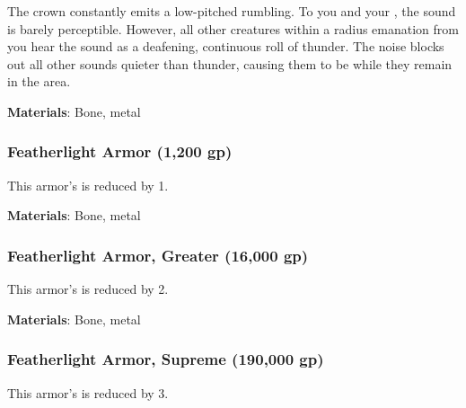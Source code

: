 The crown constantly emits a low-pitched rumbling.
To you and your , the sound is barely perceptible.
However, all other creatures within a \arealarge radius emanation from you hear the sound as a deafening, continuous roll of thunder.
The noise blocks out all other sounds quieter than thunder, causing them to be \deafened while they remain in the area.



\vspace{0.25em}
\textbf{Materials}: Bone, metal


\lowercase{\hypertarget{item:Featherlight Armor}{}}\label{item:Featherlight Armor}
\hypertarget{item:Featherlight Armor}{\subsubsection{Featherlight Armor\hfill{} (1,200 gp)}}

This armor's  is reduced by 1.



\vspace{0.25em}
\textbf{Materials}: Bone, metal


\lowercase{\hypertarget{item:Featherlight Armor, Greater}{}}\label{item:Featherlight Armor, Greater}
\hypertarget{item:Featherlight Armor, Greater}{\subsubsection{Featherlight Armor, Greater\hfill{} (16,000 gp)}}

This armor's  is reduced by 2.



\vspace{0.25em}
\textbf{Materials}: Bone, metal


\lowercase{\hypertarget{item:Featherlight Armor, Supreme}{}}\label{item:Featherlight Armor, Supreme}
\hypertarget{item:Featherlight Armor, Supreme}{\subsubsection{Featherlight Armor, Supreme\hfill{} (190,000 gp)}}

This armor's  is reduced by 3.



